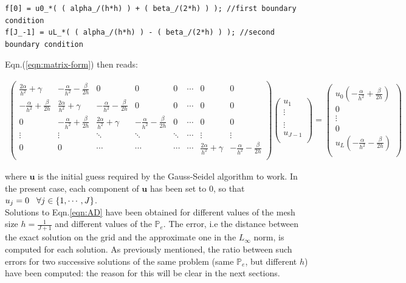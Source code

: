 \documentclass[11pt]{article}
\theoremstyle{theorem}
\theoremstyle{definition}
\begin{document}
\begin{lstlisting}
f[0] = u0_*( ( alpha_/(h*h) ) + ( beta_/(2*h) ) ); //first boundary condition
f[J_-1] = uL_*( ( alpha_/(h*h) ) - ( beta_/(2*h) ) ); //second boundary condition
\end{lstlisting}


Eqn.(\ref{eqn:matrix-form}) then reads:

\begin{align*}
	\begin{pmatrix}
	\frac{2\alpha}{h^2}+\gamma & -\frac{\alpha}{h^2}-\frac{\beta}{2h} & 0 & 0 & 0 & \cdots & 0 & 0\\
	-\frac{\alpha}{h^2}+\frac{\beta}{2h} & \frac{2\alpha}{h^2}+\gamma & -\frac{\alpha}{h^2}-\frac{\beta}{2h} & 0 & 0 & \cdots & 0 & 0\\
	0 & -\frac{\alpha}{h^2}+\frac{\beta}{2h} & \frac{2\alpha}{h^2}+\gamma & -\frac{\alpha}{h^2}-\frac{\beta}{2h} & 0 & \cdots & 0 & 0\\
	\vdots & \vdots & \ddots & \ddots & \ddots & \cdots & \vdots & \vdots \\
	0 & 0 & \cdots & \cdots & \cdots & \cdots &  \frac{2\alpha}{h^2}+\gamma & -\frac{\alpha}{h^2}-\frac{\beta}{2h}\\
	\end{pmatrix}
	\begin{pmatrix}
	u_1\\
	\vdots\\
	\\
	\vdots\\
	u_{J-1}\\		
	\end{pmatrix}
	=
	\begin{pmatrix}
	u_0\left(-\frac{\alpha}{h^2}+\frac{\beta}{2h}\right)\\
	0\\
	\vdots\\
	0\\
	u_{L}\left(-\frac{\alpha}{h^2}-\frac{\beta}{2h}\right)\\		
	\end{pmatrix}
\end{align*}

where $\mathbf{u}$ is the initial guess required by the Gauss-Seidel algorithm to work. In the present case, each component of $\mathbf{u}$ has been set to $0$, so that $u_j=0\hspace{3mm}\forall j\in\lbrace 1,\cdots, J\rbrace$.\\
Solutions to  Eqn.\eqref{eqn:AD} have been obtained for different values of the mesh size $h=\frac{1}{J+1}$ and different values of the $\mathbb{P}_e$. The error, i.e the distance between the exact solution on the grid and the approximate one in the $L_\infty$ norm, is computed for each solution. As previously mentioned, the ratio between such errors for two successive solutions of the same problem (same $\mathbb{P}_e$, but different $h$) have been computed: the reason for this will be clear in the next sections.\\
\end{document}
